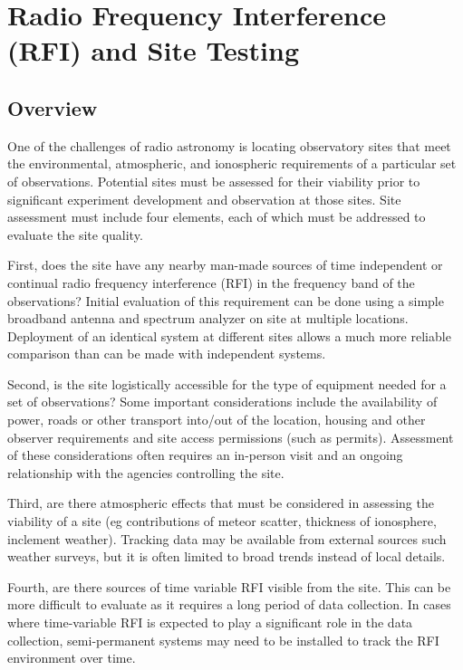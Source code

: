 \chapter{Radio Frequency Interference (RFI) and Site Testing} \label{Ch:RFI}

\section{Overview}

One of the challenges of radio astronomy is locating observatory sites that meet the environmental, atmospheric, and ionospheric requirements of a particular set of observations. Potential sites must be assessed for their viability prior to significant experiment development and observation at those sites. Site assessment must include four elements, each of which must be addressed to evaluate the site quality. 

First, does the site have any nearby man-made sources of time independent or continual radio frequency interference (RFI) in the frequency band of the observations? Initial evaluation of this requirement can be done using a simple broadband antenna and spectrum analyzer on site at multiple locations. Deployment of an identical system at different sites allows a much more reliable comparison than can be made with independent systems. 

Second, is the site logistically accessible for the type of equipment needed for a set of observations? Some important considerations include the availability of power, roads or other transport into/out of the location, housing and other observer requirements and site access permissions (such as permits). Assessment of these considerations often requires an in-person visit and an ongoing relationship with the agencies controlling the site.

Third, are there atmospheric effects that must be considered in assessing the viability of a site (eg contributions of meteor scatter, thickness of ionosphere, inclement weather). Tracking data may be available from external sources such weather surveys, but it is often limited to broad trends instead of local details. 

Fourth, are there sources of time variable RFI visible from the site. This can be more difficult to evaluate as it requires a long period of data collection. In cases where time-variable RFI is expected to play a significant role in the data collection, semi-permanent systems may need to be installed to track the RFI environment over time. 

